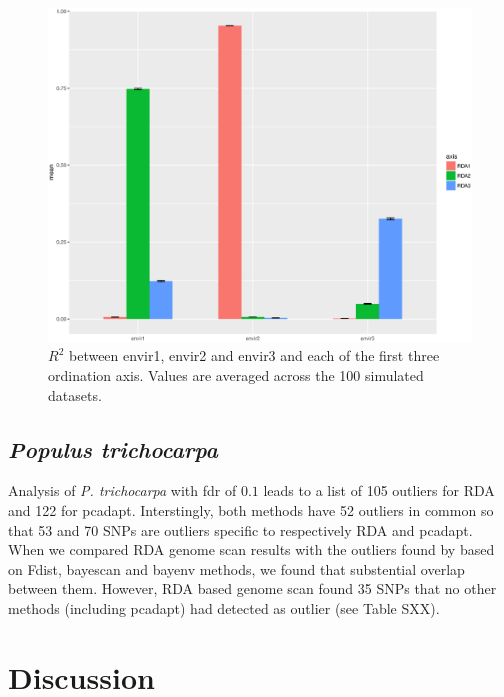 \documentclass[nogrid]{MBE}%
\begin{document}
\begin{figure}[t]
\begin{center}
\includegraphics[height=0.21\textheight]{figures/R2.eps}
\end{center}
\caption{$R^2$ between envir1, envir2 and envir3 and each of the first three ordination axis. Values are averaged across the 100 simulated datasets.}%
\label{fig:R2}%
\end{figure}



\subsection{\textit{Populus trichocarpa}}

Analysis of \textit{P. trichocarpa} with fdr of $0.1$ leads to a list of 105 outliers for RDA and 122 for pcadapt. Interstingly, both methods have 52 outliers in common so that 53 and 70 SNPs are outliers specific to respectively RDA and pcadapt. When we compared RDA genome scan results with the outliers found by \citet{Geraldes2014} based on Fdist, bayescan and bayenv methods, we found that substential overlap between them. However, RDA based genome scan found 35 SNPs that no other methods (including pcadapt) had detected as outlier (see Table SXX).


\section{Discussion}
\end{document}
